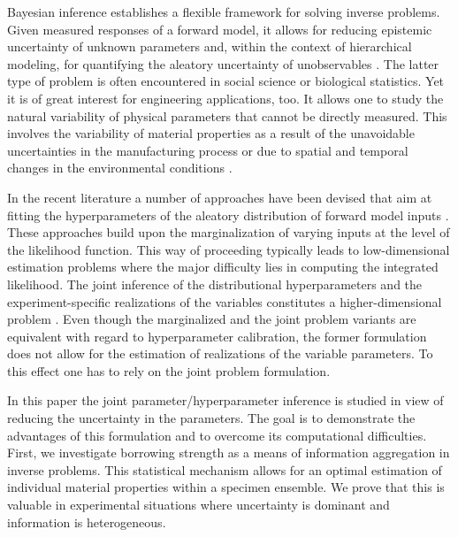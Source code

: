 Bayesian inference establishes a flexible framework for solving inverse problems.
Given measured responses of a forward model, it allows for reducing epistemic uncertainty of unknown parameters \cite{Bayesian:Hadidi2008,Bayesian:Beck2010} and,
within the context of hierarchical modeling, for quantifying the aleatory uncertainty of unobservables \cite{Multilevel:Davidian2003,Multilevel:Banks2012}.
The latter type of problem is often encountered in social science or biological statistics.
Yet it is of great interest for engineering applications, too.
It allows one to study the natural variability of physical parameters that cannot be directly measured.
This involves the variability of material properties as a result of the unavoidable uncertainties in the manufacturing process
or due to spatial and temporal changes in the environmental conditions \cite{Uncertainty:Faber2005,Uncertainty:Kiureghian2009}.
\par %
In the recent literature a number of approaches have been devised that aim at fitting the hyperparameters of the aleatory distribution of forward model inputs
\cite{Multilevel:Rocquigny2009,Multilevel:Celeux2010,Multilevel:Barbillon2011}.
These approaches build upon the marginalization of varying inputs at the level of the likelihood function. 
This way of proceeding typically leads to low-dimensional estimation problems where the major difficulty lies in computing the integrated likelihood.
The joint inference of the distributional hyperparameters and the experiment-specific realizations of the variables constitutes a higher-dimensional problem \cite{Multilevel:Fu2015,Multilevel:Behmanesh2015,Nagel:PEM2016}.
Even though the marginalized and the joint problem variants are equivalent with regard to hyperparameter calibration,
the former formulation does not allow for the estimation of realizations of the variable parameters.
To this effect one has to rely on the joint problem formulation.
\par %
In this paper the joint parameter/hyperparameter inference is studied in view of reducing the uncertainty in the parameters.
The goal is to demonstrate the advantages of this formulation and to overcome its computational difficulties.
First, we investigate borrowing strength \cite{Multilevel:Draper1992} as a means of information aggregation in inverse problems.
This statistical mechanism allows for an optimal estimation of individual material properties within a specimen ensemble.
We prove that this is valuable in experimental situations where uncertainty is dominant and information is heterogeneous.
